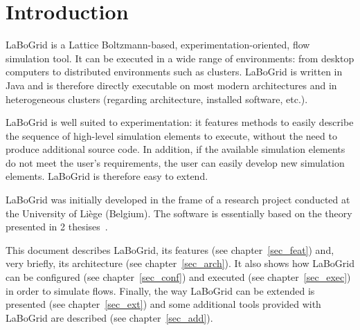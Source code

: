 \chapter{Introduction}

LaBoGrid is a Lattice Boltzmann-based, experimentation-oriented, flow simulation
tool. It can be executed in a wide range of environments: from desktop computers
to distributed environments such as clusters.
LaBoGrid is written in Java and is therefore directly executable on most modern
architectures and in heterogeneous clusters (regarding architecture, installed
software, etc.).

LaBoGrid is well suited to experimentation: it features methods to easily
describe the sequence of high-level simulation elements to execute, without the
need to produce additional source code. In addition, if the available simulation
elements do not meet the user's requirements, the user can easily develop new
simulation elements. LaBoGrid is therefore easy to extend.

LaBoGrid was initially developed in the frame of a research project conducted at
the University of Liège (Belgium). The software is essentially based on
the theory presented in 2 thesises~\cite{Beugre10,Dethier11}.

This document describes LaBoGrid, its features (see chapter~\ref{sec_feat}) and,
very briefly, its architecture (see chapter~\ref{sec_arch}). It also shows how
LaBoGrid can be configured (see chapter~\ref{sec_conf}) and executed (see
chapter~\ref{sec_exec}) in order to simulate flows. Finally, the way LaBoGrid
can be extended is presented (see chapter~\ref{sec_ext}) and some additional
tools provided with LaBoGrid are described (see chapter~\ref{sec_add}).
